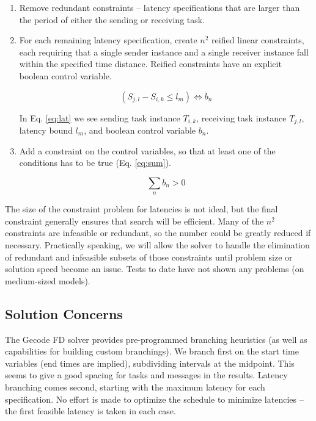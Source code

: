 \begin{enumerate}
\item Remove redundant constraints -- latency specifications that are larger than the period of either the sending or receiving task.
\item For each remaining latency specification, create $n^2$ reified linear constraints, each requiring that a single sender instance and a single receiver instance fall within the specified time distance.  Reified constraints have an explicit boolean control variable.

\begin{equation}
\label{eq:lat}
(S_{j,l}  - S_{i,k}  \leqslant l_m ) \Leftrightarrow b_n 
\end{equation}

In Eq. \ref{eq:lat} we see sending task instance $T_{i,k}$, receiving task instance $T_{j,l}$, latency bound $l_m$, and boolean control variable $b_n$.

\item Add a constraint on the control variables, so that at least one of the conditions has to be true (Eq. \ref{eq:sum}).

\begin{equation}
\label{eq:sum}
\sum\limits_n {b_n  > 0} 
\end{equation}

\end{enumerate}

The size of the constraint problem for latencies is not ideal, but the final constraint generally 
ensures that search will be efficient.   Many of the $n^2$ constraints are infeasible or redundant, so 
the number could be greatly reduced if necessary.  Practically speaking, we will allow the solver to 
handle the elimination of redundant and infeasible subsets of those constraints until problem size or 
solution speed become an issue.  Tests to date have not shown any problems (on medium-sized models).


\subsection{Solution Concerns}

The Gecode FD solver provides pre-programmed branching heuristics (as well as capabilities for building 
custom branchings).  We branch first on the start time variables (end times are implied), subdividing 
intervals at the midpoint.  This seems to give a good spacing for tasks and messages in the results.  
Latency branching comes second, starting with the maximum latency for each specification.  No effort is 
made to optimize the schedule to minimize latencies -- the first feasible latency is taken in each case.  

